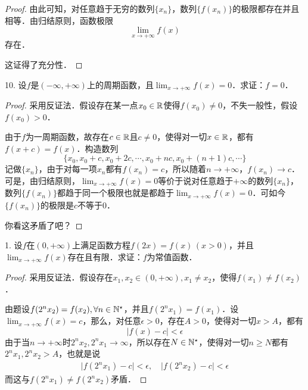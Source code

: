 \begin{proof}
    由此可知，对任意趋于无穷的数列$\{ x_n \}$，数列$\{ f(x_n) \}$的极限都存在并且相等．由归结原则，函数极限
    \begin{equation}
        \lim_{x \to +\infty} f(x)
    \end{equation}
    存在．

    这证得了充分性．
\end{proof}

10. 设$f$是$(-\infty,+\infty)$上的周期函数，且$\displaystyle\lim_{x \to +\infty} f(x) = 0$．求证：$f=0$．

\begin{proof}
采用反证法．假设存在某一点$x_0 \in \mathbb{R}$使得$f(x_0) \neq 0$，不失一般性，假设$f(x_0) > 0$．

由于$f$为一周期函数，故存在$c \in \mathbb{R}$且$c \neq 0$，使得对一切$x \in \mathbb{R}$，都有$f(x+c)=f(x)$．构造数列
\begin{equation}
    \{ x_0, x_0+c, x_0+2c, \cdots, x_0+nc, x_0+(n+1)c, \cdots \}
\end{equation}
记做$\{ x_n \}$，由于对每一项$x_n$都有$f(x_n)=c$，所以随着$n \to +\infty$，$f(x_n) \to c$．可是，由归结原则，$\displaystyle\lim_{x \to +\infty} f(x) = 0$等价于说对任意趋于$+\infty$的数列$\{ x_n \}$，数列$\{ f(x_n) \}$都趋于同一个极限也就是都趋于$\displaystyle\lim_{x \to +\infty}f(x)=0$．可如今$\{ f(x_n) \}$的极限是$c$不等于$0$．

你看这矛盾了吧？
\end{proof}

\question

1. 设$f$在$(0,+\infty)$上满足函数方程$f(2x)=f(x) \, (x>0)$，并且$\displaystyle\lim_{x \to +\infty} f(x)$存在且有限．求证：$f$为常值函数．

\begin{proof}
采用反证法．假设存在$x_1, x_2 \in (0, +\infty), x_1 \neq x_2$，使得$f(x_1) \neq f(x_2)$．

由题设$f(2^n x_2) = f(x_2), \forall n \in \mathbb{N}^\star$，并且$f(2^n x_1) = f(x_1)$．设$\displaystyle\lim_{x \to +\infty} f(x) = c$，那么，对任意$\epsilon > 0$，存在$A > 0$，使得对一切$x > A$，都有
\begin{equation}
    \lvert f(x) - c \rvert < \epsilon
\end{equation}
由于当$n \to +\infty$时$2^n x_2, 2^n x_1 \to \infty$，所以存在$N \in \mathbb{N}^\star$，使得对一切$n \geq N$都有$2^n x_1, 2^n x_2 > A$，也就是说
\begin{align}
    \lvert f(2^n x_1) - c \rvert < \epsilon, \quad \lvert f(2^n x_2) - c \rvert < \epsilon
\end{align}
而这与$f(2^n x_1) \neq f(2^n x_2)$矛盾．
\end{proof}

